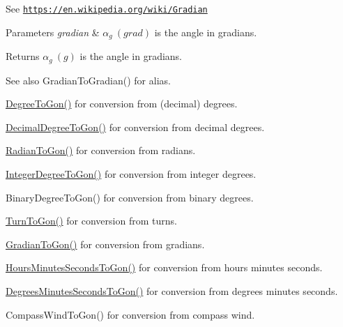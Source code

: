 See \href{https://en.wikipedia.org/wiki/Gradian}{\tt https\+://en.\+wikipedia.\+org/wiki/\+Gradian} 
\begin{DoxyParams}{Parameters}
{\em gradian} & $\alpha_{g}\ (grad)$ is the angle in gradians. \\
\hline
\end{DoxyParams}
\begin{DoxyReturn}{Returns}
$\alpha_{g}\ (g)$ is the angle in gradians. 
\end{DoxyReturn}
\begin{DoxySeeAlso}{See also}
Gradian\+To\+Gradian() for alias. 

\mbox{\hyperlink{group___e_g_x_math-_angle_conversions-_degree_ga87c3fab0867021e5d2501197b4db6194}{Degree\+To\+Gon()}} for conversion from (decimal) degrees. 

\mbox{\hyperlink{group___e_g_x_math-_angle_conversions-_decimal_degree_gaeb333a1ad0aeb913c025fbd1be85fcb3}{Decimal\+Degree\+To\+Gon()}} for conversion from decimal degrees. 

\mbox{\hyperlink{group___e_g_x_math-_angle_conversions-_radian_ga36912e5a810b64c271c4dafc17f4ca45}{Radian\+To\+Gon()}} for conversion from radians. 

\mbox{\hyperlink{group___e_g_x_math-_angle_conversions-_integer_degree_ga6e5be425c37ad27319f09329156c64bb}{Integer\+Degree\+To\+Gon()}} for conversion from integer degrees. 

Binary\+Degree\+To\+Gon() for conversion from binary degrees. 

\mbox{\hyperlink{group___e_g_x_math-_angle_conversions-_turn_gad81dd0bb1660ef24e28fa15b2403dec7}{Turn\+To\+Gon()}} for conversion from turns. 

\mbox{\hyperlink{group___e_g_x_math-_angle_conversions-_gradian_gaff399262b6c8455e450e0a9dc8eb2ad1}{Gradian\+To\+Gon()}} for conversion from gradians. 

\mbox{\hyperlink{group___e_g_x_math-_angle_conversions-_hours_minutes_seconds_ga356f1e89c3ea35a9d46967644d4ddfd3}{Hours\+Minutes\+Seconds\+To\+Gon()}} for conversion from hours minutes seconds. 

\mbox{\hyperlink{group___e_g_x_math-_angle_conversions-_degrees_minutes_seconds_ga90b481c224ad083726ffe0fd35f4dbfc}{Degrees\+Minutes\+Seconds\+To\+Gon()}} for conversion from degrees minutes seconds. 

Compass\+Wind\+To\+Gon() for conversion from compass wind. 
\end{DoxySeeAlso}
\mbox{\label{group___e_g_x_math-_angle_conversions-_gradian_ga6513a992679fbb97d2969cf8bd68306f}} 
